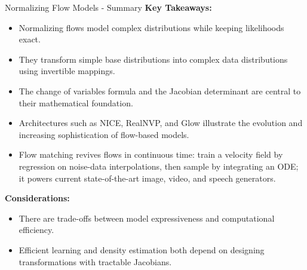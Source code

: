 \begin{frame}[allowframebreaks]{Normalizing Flow Models - Summary}
\textbf{Key Takeaways:}
\begin{itemize}
    \item Normalizing flows model complex distributions while keeping likelihoods exact.
    \item They transform simple base distributions into complex data distributions using invertible mappings.
    \item The change of variables formula and the Jacobian determinant are central to their mathematical foundation.
    \item Architectures such as NICE, RealNVP, and Glow illustrate the evolution and increasing sophistication of flow-based models.
    \item Flow matching revives flows in continuous time: train a velocity field by regression on noise-data interpolations, then sample by integrating an ODE; it powers current state-of-the-art image, video, and speech generators.
\end{itemize}
\framebreak

\textbf{Considerations:}
\begin{itemize}
    \item There are trade-offs between model expressiveness and computational efficiency.
    \item Efficient learning and density estimation both depend on designing transformations with tractable Jacobians.
\end{itemize}
\end{frame}